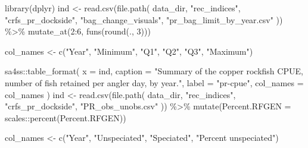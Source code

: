 \documentclass[
  letterpaper,
]{article}
\newenvironment{Shaded}{\begin{snugshade}}{\end{snugshade}}
\newcommand{\AttributeTok}[1]{\textcolor[rgb]{0.77,0.63,0.00}{#1}}
\newcommand{\DecValTok}[1]{\textcolor[rgb]{0.00,0.00,0.81}{#1}}
\newcommand{\FunctionTok}[1]{\textcolor[rgb]{0.00,0.00,0.00}{#1}}
\newcommand{\NormalTok}[1]{#1}
\newcommand{\OtherTok}[1]{\textcolor[rgb]{0.56,0.35,0.01}{#1}}
\newcommand{\SpecialCharTok}[1]{\textcolor[rgb]{0.00,0.00,0.00}{#1}}
\newcommand{\StringTok}[1]{\textcolor[rgb]{0.31,0.60,0.02}{#1}}
\begin{document}
\begin{Shaded}
\begin{Highlighting}[]
\FunctionTok{library}\NormalTok{(dplyr)}
\NormalTok{ind }\OtherTok{\textless{}{-}} \FunctionTok{read.csv}\NormalTok{(}\FunctionTok{file.path}\NormalTok{(}
\NormalTok{  data\_dir, }\StringTok{"rec\_indices"}\NormalTok{, }\StringTok{"crfs\_pr\_dockside"}\NormalTok{, }\StringTok{"bag\_change\_visuals"}\NormalTok{,}
  \StringTok{"pr\_bag\_limit\_by\_year.csv"}
\NormalTok{)) }\SpecialCharTok{\%\textgreater{}\%}
 \FunctionTok{mutate\_at}\NormalTok{(}\DecValTok{2}\SpecialCharTok{:}\DecValTok{6}\NormalTok{, }\FunctionTok{funs}\NormalTok{(}\FunctionTok{round}\NormalTok{(., }\DecValTok{3}\NormalTok{)))}

\NormalTok{col\_names }\OtherTok{\textless{}{-}} \FunctionTok{c}\NormalTok{(}\StringTok{"Year"}\NormalTok{, }\StringTok{"Minimum"}\NormalTok{, }\StringTok{"Q1"}\NormalTok{, }\StringTok{"Q2"}\NormalTok{, }\StringTok{"Q3"}\NormalTok{, }\StringTok{"Maximum"}\NormalTok{)}

\NormalTok{sa4ss}\SpecialCharTok{::}\FunctionTok{table\_format}\NormalTok{(}
  \AttributeTok{x =}\NormalTok{ ind,}
  \AttributeTok{caption =} \StringTok{"Summary of the copper rockfish CPUE, number of fish retained per}
\StringTok{             angler day, by year."}\NormalTok{,}
  \AttributeTok{label =} \StringTok{"pr{-}cpue"}\NormalTok{,}
  \AttributeTok{col\_names =}\NormalTok{ col\_names}
\NormalTok{)}
\NormalTok{ind }\OtherTok{\textless{}{-}} \FunctionTok{read.csv}\NormalTok{(}\FunctionTok{file.path}\NormalTok{(}
\NormalTok{  data\_dir, }\StringTok{"rec\_indices"}\NormalTok{, }\StringTok{"crfs\_pr\_dockside"}\NormalTok{, }\StringTok{"PR\_obs\_unobs.csv"}
\NormalTok{)) }\SpecialCharTok{\%\textgreater{}\%}
  \FunctionTok{mutate}\NormalTok{(}\AttributeTok{Percent.RFGEN =}\NormalTok{ scales}\SpecialCharTok{::}\FunctionTok{percent}\NormalTok{(Percent.RFGEN))}

\NormalTok{col\_names }\OtherTok{\textless{}{-}} \FunctionTok{c}\NormalTok{(}\StringTok{"Year"}\NormalTok{, }\StringTok{"Unspeciated"}\NormalTok{, }\StringTok{"Speciated"}\NormalTok{, }\StringTok{"Percent unspeciated"}\NormalTok{)}


\end{Highlighting}
\end{Shaded}
\end{document}
